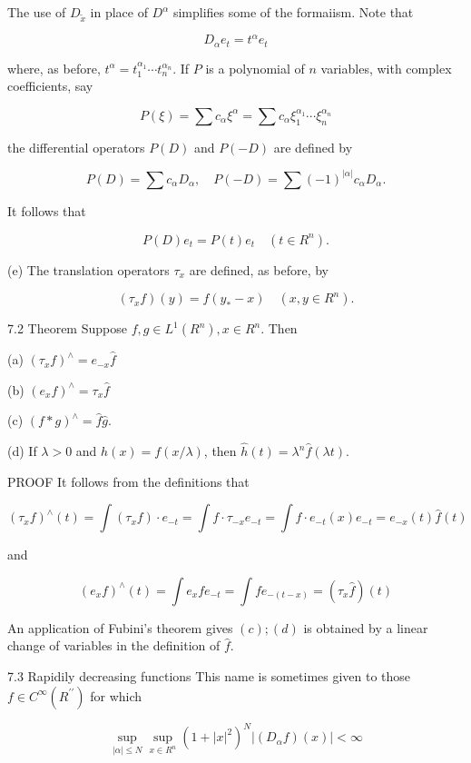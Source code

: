 \documentclass[10pt]{article}
\begin{document}
The use of $D_{\tilde{x}}$ in place of $D^{\alpha}$ simplifies some of the formaiism. Note that

$$
D_{\alpha} e_{t}=t^{\alpha} e_{t}
$$

where, as before, $t^{\alpha}=t_{1}^{\alpha_{1}} \cdots t_{n}^{\alpha_{n}}$. If $P$ is a polynomial of $n$ variables, with complex coefficients, say

$$
P(\xi)=\sum c_{\alpha} \xi^{\alpha}=\sum c_{\alpha} \xi_{1}^{\alpha_{1}} \cdots \xi_{n}^{\alpha_{n}}
$$

the differential operators $P(D)$ and $P(-D)$ are defined by

$$
P(D)=\sum c_{\alpha} D_{\alpha}, \quad P(-D)=\sum(-1)^{|\alpha|} c_{\alpha} D_{\alpha} .
$$

It follows that

$$
P(D) e_{t}=P(t) e_{t} \quad\left(t \in R^{n}\right) .
$$

(e) The translation operators $\tau_{x}$ are defined, as before, by

$$
\left(\tau_{x} f\right)(y)=f\left(y_{*}-x\right) \quad\left(x, y \in R^{n}\right) .
$$

7.2 Theorem Suppose $f, g \in L^{1}\left(R^{n}\right), x \in R^{n}$. Then

(a) $\left(\tau_{x} f\right)^{\wedge}=e_{-x} \hat{f}$

(b) $\left(e_{x} f\right)^{\wedge}=\tau_{x} \hat{f}$

(c) $(f * g)^{\wedge}=\hat{f} \hat{g}$.

(d) If $\lambda>0$ and $h(x)=f(x / \lambda)$, then $\hat{h}(t)=\lambda^{n} \hat{f}(\lambda t)$.

PROOF It follows from the definitions that

$$
\left(\tau_{x} f\right)^{\wedge}(t)=\int\left(\tau_{x} f\right) \cdot e_{-t}=\int f \cdot \tau_{-x} e_{-t}=\int f \cdot e_{-t}(x) e_{-t}=e_{-x}(t) \hat{f}(t)
$$

and

$$
\left(e_{x} f\right)^{\wedge}(t)=\int e_{x} f e_{-t}=\int f e_{-(t-x)}=\left(\tau_{x} \hat{f}\right)(t)
$$

An application of Fubini's theorem gives $(c) ;(d)$ is obtained by a linear change of variables in the definition of $\hat{f}$.

7.3 Rapidily decreasing functions This name is sometimes given to those $f \in C^{\infty}\left(R^{\prime \prime}\right)$ for which

$$
\sup _{|\alpha| \leq N} \sup _{x \in R^{n}}\left(1+|x|^{2}\right)^{N}\left|\left(D_{\alpha} f\right)(x)\right|<\infty
$$
\end{document}
